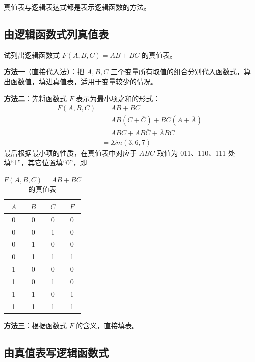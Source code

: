 真值表与逻辑表达式都是表示逻辑函数的方法。

\subsection{由逻辑函数式列真值表}
\label{sec:由逻辑函数式列真值表}

\begin{example}
	试列出逻辑函数式 $F(A,B,C)=AB+BC$ 的真值表。

	\textbf{方法一}（直接代入法）：把 $A,B,C$ 三个变量所有取值的组合分别代入函数式，算出函数值，填进真值表，适用于变量较少的情况。

	\textbf{方法二}：先将函数式 $F$ 表示为最小项之和的形式：
	\begin{equation}
		\begin{aligned}
			F(A,B,C) &= AB+BC \\
			&= AB(C+\overline{C})+BC(A+\overline{A}) \\
			&= ABC+AB\overline{C}+\overline{A}BC \\
			&= \Sigma m(3,6,7)
		\end{aligned}
		\label{eq:真值表:最小项之和}
	\end{equation}
	最后根据最小项的性质，在真值表中对应于 $ABC$ 取值为 011、110、111 处填“1”，其它位置填“0”，即

	\begin{table}[H]
	\centering
	\caption{$F(A,B,C)=AB+BC$ 的真值表}
	\label{tab:真值表:AB加BC}
	\begin{tabular}{ccc|c}
		\toprule
		$A$ & $B$ & $C$ & $F$ \\
		\midrule
		0 & 0 & 0 & 0 \\
		0 & 0 & 1 & 0 \\
		0 & 1 & 0 & 0 \\
		0 & 1 & 1 & 1 \\
		1 & 0 & 0 & 0 \\
		1 & 0 & 1 & 0 \\
		1 & 1 & 0 & 1 \\
		1 & 1 & 1 & 1 \\
		\bottomrule
	\end{tabular}
	\end{table}

	\textbf{方法三}：根据函数式 $F$ 的含义，直接填表。
\end{example}

\subsection{由真值表写逻辑函数式}
\label{sec:由真值表写逻辑函数式}

